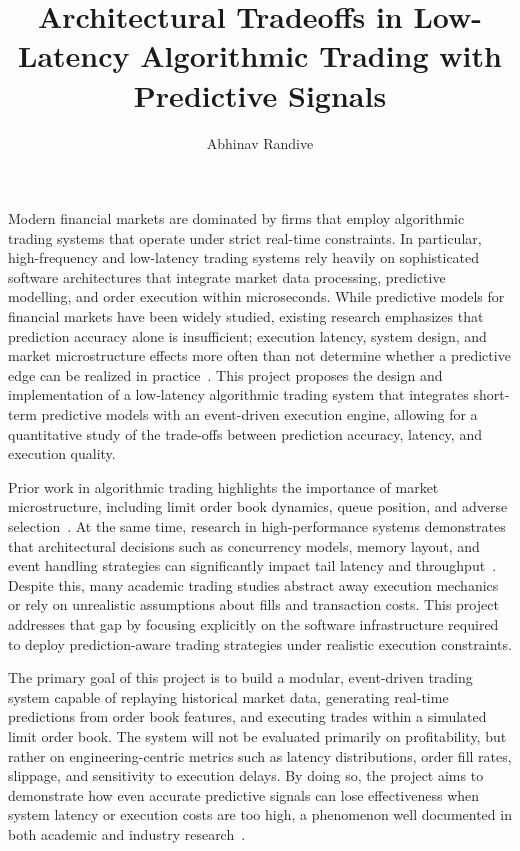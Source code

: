 \documentclass[12pt]{article}
\title{\textbf{Architectural Tradeoffs in Low-Latency Algorithmic Trading with Predictive Signals}}
\author{Abhinav Randive}
\begin{document}
\maketitle

Modern financial markets are dominated by firms that employ algorithmic trading systems that operate under strict real-time constraints. 
In particular, high-frequency and low-latency trading systems rely heavily on sophisticated software architectures that integrate market data processing, predictive modelling, and order execution within microseconds. 
While predictive models for financial markets have been widely studied, existing research emphasizes that prediction accuracy alone is insufficient; execution latency, system design, and market microstructure effects more often than not determine whether a predictive edge can be realized in practice~\cite{aldridgeHFT, carteaMicrostructure}. 
This project proposes the design and implementation of a low-latency algorithmic trading system that integrates short-term predictive models with an event-driven execution engine, allowing for a quantitative study of the trade-offs between prediction accuracy, latency, and execution quality.

Prior work in algorithmic trading highlights the importance of market microstructure, including limit order book dynamics, queue position, and adverse selection~\cite{harrisTrading}. 
At the same time, research in high-performance systems demonstrates that architectural decisions such as concurrency models, memory layout, and event handling strategies can significantly impact tail latency and throughput~\cite{stonebrakerLatency}. 
Despite this, many academic trading studies abstract away execution mechanics or rely on unrealistic assumptions about fills and transaction costs. This project addresses that gap by focusing explicitly on the software infrastructure required to deploy prediction-aware trading strategies under realistic execution constraints.


The primary goal of this project is to build a modular, event-driven trading system capable of replaying historical market data, generating real-time predictions from order book features, and executing trades within a simulated limit order book. 
The system will not be evaluated primarily on profitability, but rather on engineering-centric metrics such as latency distributions, order fill rates, slippage, and sensitivity to execution delays. 
By doing so, the project aims to demonstrate how even accurate predictive signals can lose effectiveness when system latency or execution costs are too high, a phenomenon well documented in both academic and industry research~\cite{bouchaudTrades}.
\end{document}
